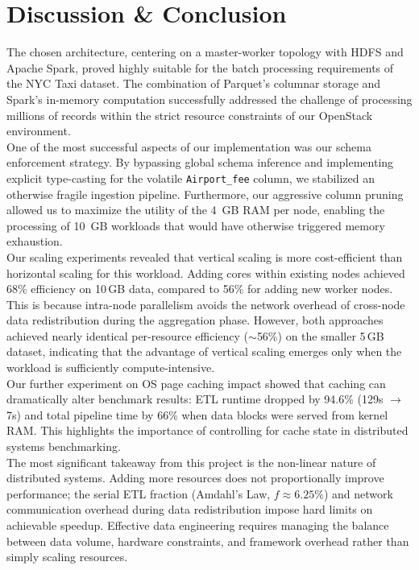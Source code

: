 
\section{Discussion \& Conclusion}
\label{sec:discussion-conclusion}

The chosen architecture, centering on a master-worker topology with HDFS and Apache Spark, proved highly suitable for the batch processing requirements of the NYC Taxi dataset. The combination of Parquet's columnar storage and Spark's in-memory computation successfully addressed the challenge of processing millions of records within the strict resource constraints of our OpenStack environment.\\

One of the most successful aspects of our implementation was our schema enforcement strategy. By bypassing global schema inference and implementing explicit type-casting for the volatile \texttt{Airport\_fee} column, we stabilized an otherwise fragile ingestion pipeline. Furthermore, our aggressive column pruning allowed us to maximize the utility of the 4~GB RAM per node, enabling the processing of 10~GB workloads that would have otherwise triggered memory exhaustion.\\

Our scaling experiments revealed that vertical scaling is more cost-efficient than horizontal scaling for this workload. Adding cores within existing nodes achieved 68\% efficiency on 10\,GB data, compared to 56\% for adding new worker nodes. This is because intra-node parallelism avoids the network overhead of cross-node data redistribution during the aggregation phase. However, both approaches achieved nearly identical per-resource efficiency ($\sim$56\%) on the smaller 5\,GB dataset, indicating that the advantage of vertical scaling emerges only when the workload is sufficiently compute-intensive.\\

Our further experiment on OS page caching impact showed that caching can dramatically alter benchmark results: ETL runtime dropped by 94.6\% (129s $\to$ 7s) and total pipeline time by 66\% when data blocks were served from kernel RAM. This highlights the importance of controlling for cache state in distributed systems benchmarking.\\

The most significant takeaway from this project is the non-linear nature of distributed systems. Adding more resources does not proportionally improve performance; the serial ETL fraction (Amdahl's Law, $f \approx 6.25\%$) and network communication overhead during data redistribution impose hard limits on achievable speedup. Effective data engineering requires managing the balance between data volume, hardware constraints, and framework overhead rather than simply scaling resources.